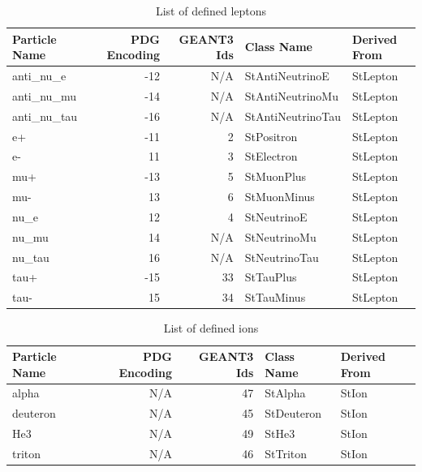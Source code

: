 \documentclass[twoside]{article}
\begin{document}
\begin{table}[htb]
    \begin{center}
    \begin{tabular}{|l|r|r|l| l |}
        \hline
        \textbf{Particle Name} & \textbf{PDG Encoding} & \textbf{GEANT3 Ids}  & \textbf{Class Name} & \textbf{Derived From} \\ \hline
     anti\_nu\_e  & -12   & N/A   &      StAntiNeutrinoE  & StLepton       \\ \hline
    anti\_nu\_mu  & -14   & N/A   &     StAntiNeutrinoMu  & StLepton       \\ \hline
   anti\_nu\_tau  & -16   & N/A   &    StAntiNeutrinoTau  & StLepton       \\ \hline
            e+  & -11   & 2     &           StPositron  & StLepton       \\ \hline
            e-  & 11    & 3     &           StElectron  & StLepton       \\ \hline
           mu+  & -13   & 5     &           StMuonPlus  & StLepton       \\ \hline
           mu-  & 13    & 6     &          StMuonMinus  & StLepton       \\ \hline
          nu\_e  & 12    & 4     &          StNeutrinoE  & StLepton       \\ \hline
         nu\_mu  & 14    & N/A   &         StNeutrinoMu  & StLepton       \\ \hline
        nu\_tau  & 16    & N/A   &        StNeutrinoTau  & StLepton       \\ \hline
          tau+  & -15   & 33    &            StTauPlus  & StLepton       \\ \hline
          tau-  & 15    & 34    &           StTauMinus  & StLepton       \\ \hline
    \end{tabular}            
    \caption{List of defined leptons}
    \label{tab:leptons}
    \end{center}
\end{table}

\begin{table}[htb]
    \begin{center}
    \begin{tabular}{|l|r|r|l| l |}
        \hline
        \textbf{Particle Name} & \textbf{PDG Encoding} & \textbf{GEANT3 Ids}  & \textbf{Class Name} & \textbf{Derived From} \\ \hline
         alpha  & N/A   & 47    &              StAlpha  & StIon          \\ \hline
      deuteron  & N/A   & 45    &           StDeuteron  & StIon          \\ \hline
           He3  & N/A   & 49    &                StHe3  & StIon          \\ \hline
        triton  & N/A   & 46    &             StTriton  & StIon          \\ \hline
    \end{tabular}            
    \caption{List of defined ions}
    \label{tab:ions}
    \end{center}
\end{table}
\end{document}
